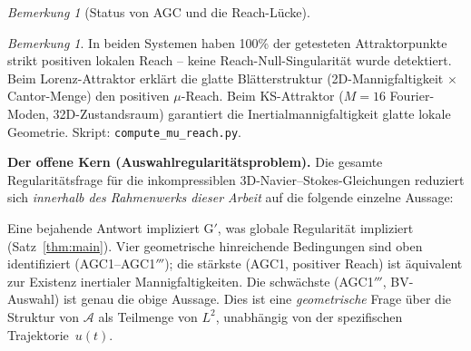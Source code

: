 \documentclass[12pt,a4paper]{article}
\theoremstyle{definition}
\theoremstyle{plain}
\theoremstyle{remark}
\newtheorem{remark}[definition]{Bemerkung}
\begin{document}
\begin{remark}[Status von AGC und die Reach-Lücke]
\begin{remark}
In beiden Systemen haben 100\% der getesteten Attraktorpunkte strikt positiven
lokalen Reach -- keine Reach-Null-Singularität wurde detektiert.
Beim Lorenz-Attraktor erklärt die glatte Blätterstruktur
(2D-Mannigfaltigkeit $\times$ Cantor-Menge) den positiven $\mu$-Reach.
Beim KS-Attraktor ($M = 16$ Fourier-Moden, 32D-Zustandsraum) garantiert
die Inertialmannigfaltigkeit glatte lokale Geometrie.
Skript: \texttt{compute\_mu\_reach.py}.
\end{remark}

\medskip\noindent
\textbf{Der offene Kern (Auswahlregularitätsproblem).}\;
Die gesamte Regularitätsfrage für die inkompressiblen 3D-Navier--Stokes-Gleichungen
reduziert sich \emph{innerhalb des Rahmenwerks dieser Arbeit} auf die
folgende einzelne Aussage:

\begin{center}
\end{center}

\noindent
Eine bejahende Antwort impliziert G$'$, was globale Regularität impliziert
(Satz~\ref{thm:main}). Vier geometrische hinreichende Bedingungen sind
oben identifiziert (AGC1--AGC1$'''$); die stärkste (AGC1, positiver Reach)
ist äquivalent zur Existenz inertialer Mannigfaltigkeiten. Die schwächste
(AGC1$'''$, BV-Auswahl) ist genau die obige Aussage.
Dies ist eine \emph{geometrische} Frage über die Struktur von
$\mathcal{A}$ als Teilmenge von $L^2$, unabhängig von der spezifischen
Trajektorie~$u(t)$.


\end{remark}
\end{document}
